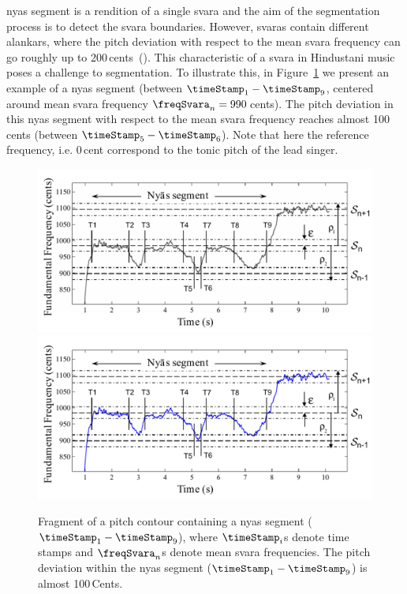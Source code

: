 {\Gls{nyas} segment is a rendition of a single \gls{svara} and the aim of the segmentation process is to detect the \gls{svara} boundaries. However, \glspl{svara} contain different \glspl{alankar}, where the pitch deviation with respect to the mean \gls{svara} frequency can go roughly up to 200\,cents~(). This characteristic of a \gls{svara} in Hindustani music poses a challenge to segmentation. To illustrate this, in Figure~\ref{fig:nyas_segmentation_illustration} we present an example of a \gls{nyas} segment (between $\timeStamp_1-\timeStamp_9$, centered around mean \gls{svara} frequency $\freqSvara_n=990$\,cents). The pitch deviation in this \gls{nyas} segment with respect to the mean \gls{svara} frequency reaches almost 100\,cents (between $\timeStamp_5-\timeStamp_6$). Note that here the reference frequency, i.e. 0\,cent correspond to the tonic pitch of the lead singer.

\begin{figure}
	\begin{center}
		\ifdefined\PRINTVER
			\includegraphics[width=\figSizeNinety]{ch05_preprocessing/figures/NyasSegmentationMethod_BW.pdf}
		\else
			\includegraphics[width=\figSizeNinety]{ch05_preprocessing/figures/NyasSegmentationMethod.pdf}
		\fi
	\end{center}
	\caption[Illustration of the \gls{nyas} segmentation process]{Fragment of a pitch contour containing a \gls{nyas} segment ($\timeStamp_1-\timeStamp_9$), where $\timeStamp_i$s denote time stamps and $\freqSvara_n$s denote mean \gls{svara} frequencies. The pitch deviation within the \gls{nyas} segment ($\timeStamp_1-\timeStamp_9$) is almost 100\,Cents.}
	\label{fig:nyas_segmentation_illustration}
\end{figure}

}
